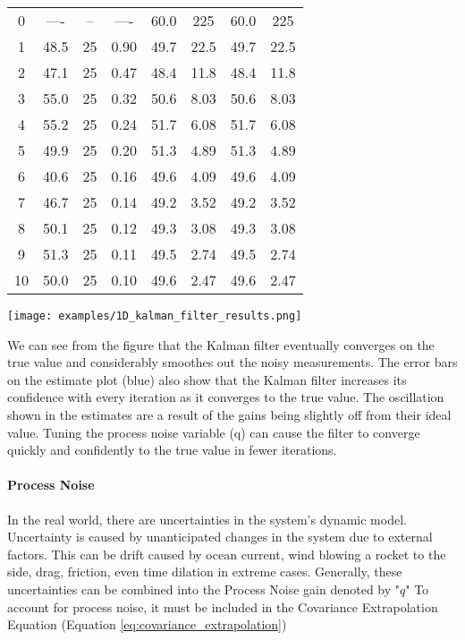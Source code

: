 \begin{example}
\begin{center}
\begin{tabular}{c | c | c | c | c | c | c | c}
                0  & ---- & -- & ---- & 60.0 & 225  & 60.0 & 225  \\
                1  & 48.5 & 25 & 0.90 & 49.7 & 22.5 & 49.7 & 22.5 \\
                2  & 47.1 & 25 & 0.47 & 48.4 & 11.8 & 48.4 & 11.8 \\
                3  & 55.0 & 25 & 0.32 & 50.6 & 8.03 & 50.6 & 8.03 \\
                4  & 55.2 & 25 & 0.24 & 51.7 & 6.08 & 51.7 & 6.08 \\
                5  & 49.9 & 25 & 0.20 & 51.3 & 4.89 & 51.3 & 4.89 \\
                6  & 40.6 & 25 & 0.16 & 49.6 & 4.09 & 49.6 & 4.09 \\
                7  & 46.7 & 25 & 0.14 & 49.2 & 3.52 & 49.2 & 3.52 \\
                8  & 50.1 & 25 & 0.12 & 49.3 & 3.08 & 49.3 & 3.08 \\
                9  & 51.3 & 25 & 0.11 & 49.5 & 2.74 & 49.5 & 2.74 \\
                10 & 50.0 & 25 & 0.10 & 49.6 & 2.47 & 49.6 & 2.47 \\
    
                \bottomrule
                \end{tabular}
            \end{center}

            \begin{center}
                \texttt{[image: examples/1D\_kalman\_filter\_results.png]}
            \end{center}

            We can see from the figure that the Kalman filter eventually converges on the true value and considerably smoothes out the noisy measurements.
            The error bars on the estimate plot (blue) also show that the Kalman filter increases its confidence with every iteration as it converges to the true value.
            The oscillation shown in the estimates are a result of the gains being slightly off from their ideal value.
            Tuning the process noise variable (q) can cause the filter to converge quickly and confidently to the true value in fewer iterations.

        \end{example}

        
        \paragraph*{Process Noise} In the real world, there are uncertainties in the system's dynamic model.
        Uncertainty is caused by unanticipated changes in the system due to external factors.
        This can be drift caused by ocean current, wind blowing a rocket to the side, drag, friction, even time dilation in extreme cases.
        Generally, these uncertainties can be combined into the Process Noise gain denoted by "$q$"
        To account for process noise, it must be included in the Covariance Extrapolation Equation (Equation \ref{eq:covariance_extrapolation})

